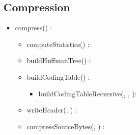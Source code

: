 \subsection{Compression}


\begin{itemize}
    \item compress(\binaryFile) : \binaryFile
    \begin{itemize}
        \item computeStatistics(\binaryFile) : \statistics
        \item buildHuffmanTree(\statistics) : \huffmanTree
        \item buildCodingTable(\huffmanTree) : \codingTable
        \begin{itemize}
            \item buildCodingTableRecursive(\huffmanTree, \codingTable, \binaryCode): \codingTable
        \end{itemize}
        \item writeHeader(\binaryFile, \codingTable) : \binaryFile
        \item compressSourceBytes(\binaryFile, \codingTable) : \binaryFile
    \end{itemize}
\end{itemize}
